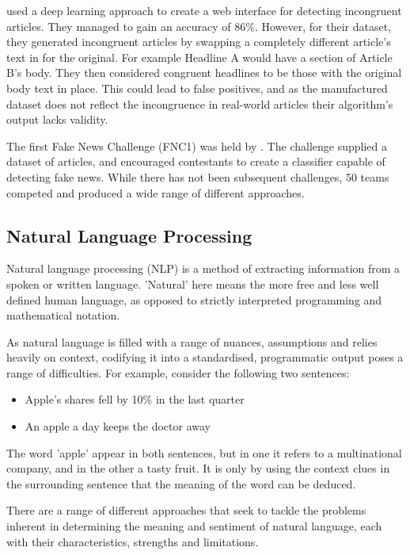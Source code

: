  used a deep learning approach to create a web interface for detecting incongruent articles. They managed to gain an accuracy of 86\%. However, for their dataset, they generated incongruent articles by swapping a completely different article's text in for the original. For example Headline A would have a section of Article B's body. They then considered congruent headlines to be those with the original body text in place. This could lead to false positives, and as the manufactured dataset does not reflect the incongruence in real-world articles their algorithm's output lacks validity.

The first Fake News Challenge (FNC1) was held by . The challenge supplied a dataset of articles, and encouraged contestants to create a classifier capable of detecting fake news. While there has not been subsequent challenges, 50 teams competed and produced a wide range of different approaches. 

\subsection{Natural Language Processing}
Natural language processing (NLP) is a method of extracting information from a spoken or written language. 'Natural' here means the more free and less well defined human language, as opposed to strictly interpreted programming and mathematical notation. \cite{jackson2002}

 As natural language is filled with a range of nuances, assumptions and relies heavily on context, codifying it into a standardised, programmatic output poses a range of difficulties. For example, consider the following two sentences:

\begin{itemize}
	\item Apple's shares fell by 10\% in the last quarter
	\item An apple a day keeps the doctor away
\end{itemize}

The word 'apple' appear in both sentences, but in one it refers to a multinational company, and in the other a tasty fruit. It is only by using the context clues in the surrounding sentence that the meaning of the word can be deduced.

There are a range of different approaches that seek to tackle the problems inherent in determining the meaning and sentiment of natural language, each with their  characteristics, strengths and limitations. 

